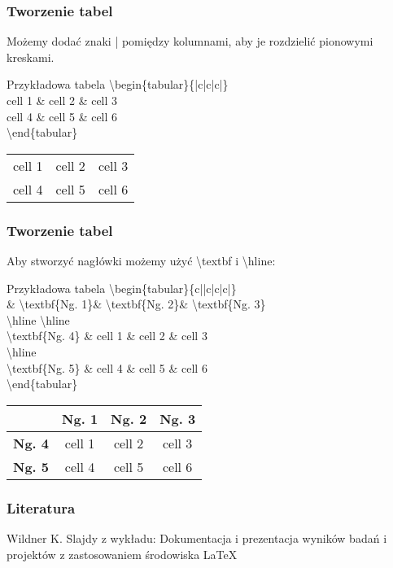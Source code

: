 \documentclass{beamer}%
\begin{document}

\begin{frame}
\frametitle{Tworzenie tabel}
Możemy dodać znaki | pomiędzy kolumnami, aby je rozdzielić
pionowymi kreskami.
\begin{block}{Przykładowa tabela}
\textbackslash begin\{tabular\}\{|c|c|c|\}\\
cell 1 \& cell 2 \& cell 3 \\
cell 4 \& cell 5 \& cell 6 \\
\textbackslash end\{tabular\}

\end{block}
\pause
\begin{tabular}{|c|c|c|}
cell 1 & cell 2 & cell 3 \\
cell 4 & cell 5 & cell 6 \\
\end{tabular}

\end{frame}




\begin{frame}
\frametitle{Tworzenie tabel}
Aby stworzyć nagłówki możemy użyć \textbackslash textbf i \textbackslash hline:
\begin{block}{Przykładowa tabela}
\textbackslash begin\{tabular\}\{c||c|c|c|\}\\
\& \textbackslash textbf\{Ng. 1\}\& \textbackslash textbf\{Ng. 2\}\& \textbackslash textbf\{Ng. 3\}\\
\textbackslash hline \textbackslash hline\\
\textbackslash textbf\{Ng. 4\} \& cell 1 \& cell 2 \& cell 3 \\
\textbackslash hline\\
\textbackslash textbf\{Ng. 5\} \& cell 4 \& cell 5 \& cell 6 \\
\textbackslash end\{tabular\}


\end{block}
\pause
\begin{tabular}{c||c|c|c|}
& \textbf{Ng. 1}& \textbf{Ng. 2}& \textbf{Ng. 3}\\
\hline \hline
\textbf{Ng. 4} & cell 1 & cell 2 & cell 3 \\
\hline
\textbf{Ng. 5} & cell 4 & cell 5 & cell 6 \\
\end{tabular}


\end{frame}

\begin{frame}
\frametitle{Literatura}
\begin{thebibliography}{9}
 Wildner K. Slajdy z wykładu: Dokumentacja i prezentacja wyników badań i projektów z
zastosowaniem środowiska \LaTeX

\end{thebibliography}
\end{frame}
\end{document}
